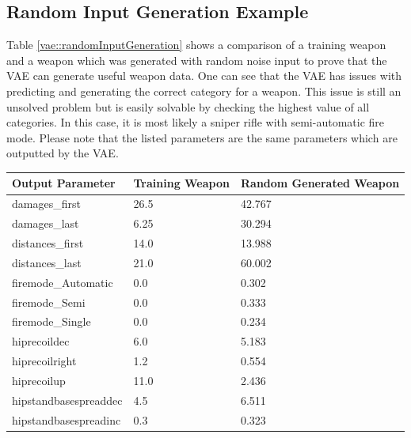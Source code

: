 \documentclass[MGS,Master,english]{twbook}%
\begin{document}
\subsection{Random Input Generation Example} \label{vae::randomInputExample}
Table \ref{vae::randomInputGeneration} shows a comparison of a training weapon and a weapon which was generated with random noise input to prove that the VAE can generate useful weapon data. One can see that the VAE has issues with predicting and generating the correct category for a weapon. This issue is still an unsolved problem but is easily solvable by checking the highest value of all categories. In this case, it is most likely a sniper rifle with semi-automatic fire mode. Please note that the listed parameters are the same parameters which are outputted by the VAE.
\begin{table}[!ht]
	\centering
	\begin{tabular}{|l|p{3.6cm}|p{3.6cm}|}
		\hline
		\textbf{Output Parameter}       & \textbf{Training Weapon} & \textbf{Random Generated Weapon} \\ \hline\hline
		damages\_first           & 26.5                 & 42.767                    \\ \hline
		damages\_last            & 6.25                 & 30.294                    \\ \hline
		distances\_first    & 14.0                 & 13.988                    \\ \hline
		distances\_last     & 21.0                 & 60.002                    \\ \hline
		firemode\_Automatic      & 0.0                  & 0.302                     \\ \hline
		firemode\_Semi & 0.0                  & 0.333                     \\ \hline
		firemode\_Single & 0.0                  & 0.234                     \\ \hline
		hiprecoildec             & 6.0                  & 5.183                     \\ \hline
		hiprecoilright           & 1.2                  & 0.554                     \\ \hline
		hiprecoilup              & 11.0                 & 2.436                     \\ \hline
		hipstandbasespreaddec    & 4.5                  & 6.511                     \\ \hline
		hipstandbasespreadinc    & 0.3                  & 0.323                     \\ \hline

\end{tabular}
\end{table}
\end{document}
